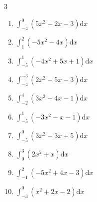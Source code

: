 \begin{multicols}{3}
\begin{enumerate}
        \phantom{$\displaystyle =1$}

\columnbreak %

  \item $\displaystyle \int_{-4}^{0}\left( 5x^{2}+2x-3 \right) \mathrm{d}x$


  \item $\displaystyle \int_{1}^{2}\left( -5x^{2}-4x \right) \mathrm{d}x$


  \item $\displaystyle \int_{-5}^{1}\left( -4x^{2}+5x+1 \right) \mathrm{d}x$

        \phantom{$\displaystyle =-227$}

  \item $\displaystyle \int_{-4}^{-3}\left( 2x^{2}-5x-3 \right) \mathrm{d}x$


  \item $\displaystyle \int_{-2}^{4}\left( 3x^{2}+4x-1 \right) \mathrm{d}x$

        \phantom{$\displaystyle =95$}

\columnbreak %

\resetques

  \item $\displaystyle \int_{-5}^{1}\left( -3x^{2}-x-1 \right) \mathrm{d}x$

        \phantom{$\displaystyle =-115$}

  \item $\displaystyle \int_{-5}^{0}\left( 3x^{2}-3x+5 \right) \mathrm{d}x$


  \item $\displaystyle \int_{0}^{3}\left( 2x^{2}+x \right) \mathrm{d}x$


  \item $\displaystyle \int_{-1}^{2}\left( -5x^{2}+4x-3 \right) \mathrm{d}x$


  \item $\displaystyle \int_{-3}^{0}\left( x^{2}+2x-2 \right) \mathrm{d}x$

        \phantom{$\displaystyle =-1$}


\end{enumerate}
\end{multicols}
